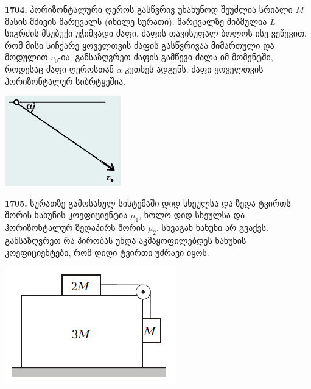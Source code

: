 \documentclass[12pt,a4paper,]{report}
\begin{document}
\textbf{1704.} ჰორიზონტალური ღეროს გასწვრივ უხახუნოდ შეუძლია სრიალი $M$ მასის მძივის მარცვალს (იხილე სურათი). მარცვალზე მიბმულია $L$ სიგრძის მსუბუქი უჭიმვადი ძაფი. ძაფის თავისუფალ ბოლოს ისე ვეწევით, რომ მისი სიჩქარე ყოველთვის ძაფის გასწვრივაა მიმართული და მოდულით $v_0$-ია. განსაზღვრეთ ძაფის გამწევი ძალა იმ მომენტში, როდესაც ძაფი ღეროსთან $\alpha$ კუთხეს ადგენს.  ძაფი ყოველთვის ჰორიზონტალურ სიბრტყეშია.
		\begin{center}
			\includegraphics[scale=0.5]{images/F1704}
		\end{center}

\textbf{1705.} სურათზე გამოსახულ სისტემაში დიდ სხეულსა და ზედა ტვირთს შორის ხახუნის კოეფიციენტია $\mu_1$, ხოლო დიდ სხეულსა და ჰორიზონტალურ ზედაპირს შორის $\mu_2$. სხვაგან ხახუნი არ გვაქვს. განსაზღვრეთ რა პირობას უნდა აკმაყოფილებდეს ხახუნის კოეფიციენტები, რომ დიდი ტვირთი უძრავი იყოს.
		\begin{center}
			\includegraphics[scale=0.5]{images/F1705.png}
		\end{center}
\end{document}
